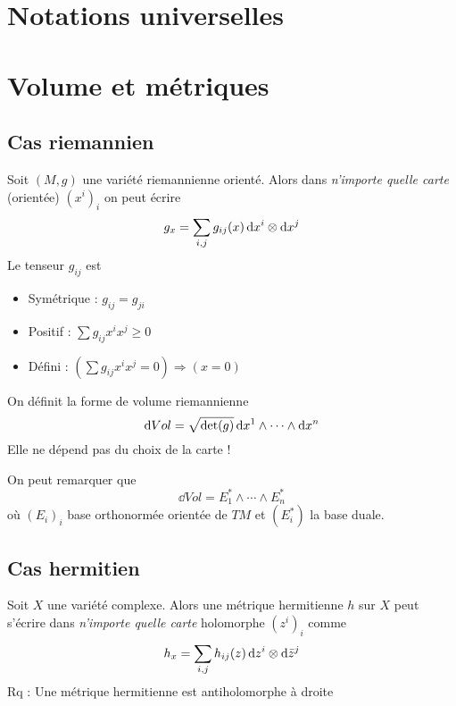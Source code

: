 \documentclass[12pt,makeidx]{amsart}
\begin{document}
\section{Notations universelles}
\medskip
\begin{center}
\fbox{$\tau = 2\pi$}
\end{center}
\medskip

\section{Volume et métriques}
\subsection{Cas riemannien}
Soit $(M,g)$ une variété riemannienne orienté. Alors dans \textit{n'importe quelle carte} (orientée) $(x^i)_i$
on peut écrire
\begin{equation}\label{MetriqueRiemann}\index{MetriqueRiemann@Métrique riemannienne}
g_x = \sum_{i,j} g_{ij}(x) \dd x^i \otimes \dd x^j
\end{equation}
Le tenseur $g_{ij}$ est
\begin{itemize}
\item Symétrique : $g_{ij} = g_{ji}$
\item Positif : $\sum g_{ij}x^ix^j \geq 0$
\item Défini : $\left(\sum g_{ij}x^ix^j = 0 \right)\Rightarrow \left(x = 0\right)$
\end{itemize}

On définit la forme de volume riemannienne 
\begin{equation}\label{VolumeRiemann}\index{VolumeRiemann@Volume riemannien}
\dd Vol = \sqrt{\det(g)} \dd x^1 \wedge \cdots \wedge \dd x^n
\end{equation}
Elle ne dépend pas du choix de la carte !

On peut remarquer que \begin{equation}
\dd Vol = E^*_1 \wedge \cdots  \wedge E^*_n
\end{equation}
où $(E_i)_i$ base orthonormée orientée de $TM$ et $(E_i^*)$ la base duale.

\subsection{Cas hermitien}
Soit $X$ une variété complexe. Alors une métrique hermitienne $h$ sur $X$ peut s'écrire dans \textit{n'importe quelle carte} holomorphe $(z^i)_i$ comme
\begin{equation}\label{MetriqueHermit}\index{MetriqueHermit@Métrique hermitienne}
h_x = \sum_{i,j} h_{ij}(z) \dd z^i \otimes \dd \bar{z}^j
\end{equation}
Rq : Une métrique hermitienne est antiholomorphe à droite
\end{document}
